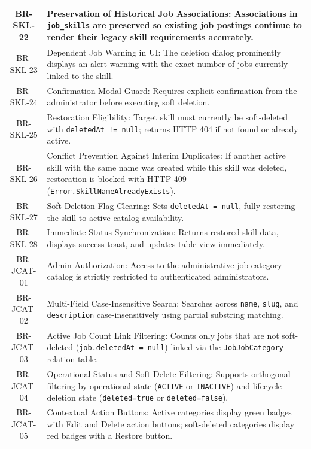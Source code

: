 \begin{longtable}{|c|p{12cm}|}
    BR-SKL-22 & Preservation of Historical Job Associations: Associations in \texttt{job\_skills} are preserved so existing job postings continue to render their legacy skill requirements accurately. \\ \hline
    BR-SKL-23 & Dependent Job Warning in UI: The deletion dialog prominently displays an alert warning with the exact number of jobs currently linked to the skill. \\ \hline
    BR-SKL-24 & Confirmation Modal Guard: Requires explicit confirmation from the administrator before executing soft deletion. \\ \hline
    BR-SKL-25 & Restoration Eligibility: Target skill must currently be soft-deleted with \texttt{deletedAt != null}; returns HTTP 404 if not found or already active. \\ \hline
    BR-SKL-26 & Conflict Prevention Against Interim Duplicates: If another active skill with the same name was created while this skill was deleted, restoration is blocked with HTTP 409 (\texttt{Error.\allowbreak Skill\allowbreak Name\allowbreak Already\allowbreak Exists}). \\ \hline
    BR-SKL-27 & Soft-Deletion Flag Clearing: Sets \texttt{deletedAt = null}, fully restoring the skill to active catalog availability. \\ \hline
    BR-SKL-28 & Immediate Status Synchronization: Returns restored skill data, displays success toast, and updates table view immediately. \\ \hline
    BR-JCAT-01 & Admin Authorization: Access to the administrative job category catalog is strictly restricted to authenticated administrators. \\ \hline
    BR-JCAT-02 & Multi-Field Case-Insensitive Search: Searches across \texttt{name}, \texttt{slug}, and \texttt{description} case-insensitively using partial substring matching. \\ \hline
    BR-JCAT-03 & Active Job Count Link Filtering: Counts only jobs that are not soft-deleted (\texttt{job.deletedAt = null}) linked via the \texttt{JobJobCategory} relation table. \\ \hline
    BR-JCAT-04 & Operational Status and Soft-Delete Filtering: Supports orthogonal filtering by operational state (\texttt{ACTIVE} or \texttt{INACTIVE}) and lifecycle deletion state (\texttt{deleted=true} or \texttt{deleted=false}). \\ \hline
    BR-JCAT-05 & Contextual Action Buttons: Active categories display green badges with Edit and Delete action buttons; soft-deleted categories display red badges with a Restore button. \\ \hline

\end{longtable}
